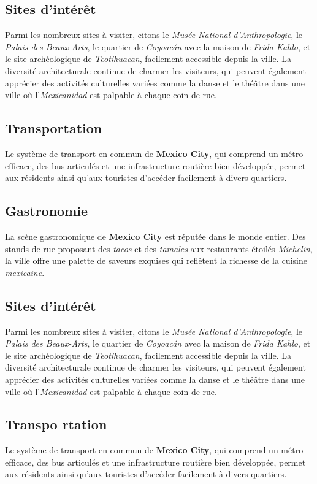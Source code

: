 \documentclass[12pt, a4paper]{article}
\begin{document}
\subsection*{\textbf{Sites d'intérêt}}

Parmi les nombreux sites à visiter, citons le \textit{Musée National d'Anthropologie}, le \textit{Palais des Beaux-Arts}, le quartier de \textit{Coyoacán} avec la maison de \textit{Frida Kahlo}, et le site archéologique de \textit{Teotihuacan}, facilement accessible depuis la ville.
La diversité architecturale continue de charmer les visiteurs, qui peuvent également apprécier des activités culturelles variées comme la danse et le théâtre dans une ville où l'\textit{Mexicanidad} est palpable à chaque coin de rue. \subsection*{\textbf{Transportation}} Le système de transport en commun de \textbf{Mexico City}, qui comprend un métro efficace, des bus articulés et une infrastructure routière bien développée, permet aux résidents ainsi qu'aux touristes d'accéder facilement à divers quartiers.

\subsection*{\textbf{Gastronomie}}

La scène gastronomique de \textbf{Mexico City} est réputée dans le monde entier. Des stands de rue proposant des \textit{tacos} et des \textit{tamales} aux restaurants étoilés \textit{Michelin}, la ville offre une palette de saveurs exquises qui reflètent la richesse de la cuisine \textit{mexicaine}.

\subsection*{\textbf{Sites d'intérêt}}

Parmi les nombreux sites à visiter, citons le \textit{Musée National d'Anthropologie}, le \textit{Palais des Beaux-Arts}, le quartier de \textit{Coyoacán} avec la maison de \textit{Frida Kahlo}, et le site archéologique de \textit{Teotihuacan}, facilement accessible depuis la ville.
La diversité architecturale continue de charmer les visiteurs, qui peuvent également apprécier des activités culturelles variées comme la danse et le théâtre dans une ville où l'\textit{Mexicanidad} est palpable à chaque coin de rue. \subsection*{\textbf{Transpo
rtation}} Le système de transport en commun de \textbf{Mexico City}, qui comprend un métro efficace, des bus articulés et une infrastructure routière bien développée, permet aux résidents ainsi qu'aux touristes d'accéder facilement à divers quartiers.
\end{document}
